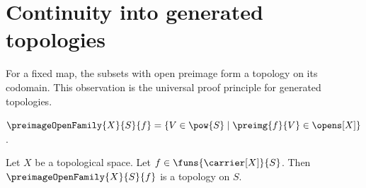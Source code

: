 \section{Continuity into generated topologies}





For a fixed map, the subsets with open preimage form a topology on its
codomain.  This observation is the universal proof principle for generated
topologies.

\begin{definition}\label{preimage_open_family}
    $\preimageOpenFamily{X}{S}{f}
        =\{V\in\pow{S}\mid \preimg{f}{V}\in\opens[X]\}$.
\end{definition}

\begin{theorem}\label{preimage_open_family_is_topology}
    Let $X$ be a topological space.
    Let $f\in\funs{\carrier[X]}{S}$.
    Then $\preimageOpenFamily{X}{S}{f}$ is a topology on $S$.
\end{theorem}
